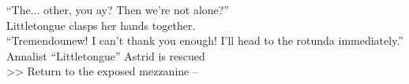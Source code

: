 “The... other\lisp , you \lisp ay? Then we’re not alone?”\\

Littletongue clasps her hands together.\\
“Tremendou\lispx new\lisp ! I can’t thank you enough! I’ll head to the rotunda immediately.”\\
 Annalist “Littletongue” Astrid is rescued\\

>> Return to the exposed mezzanine -- 